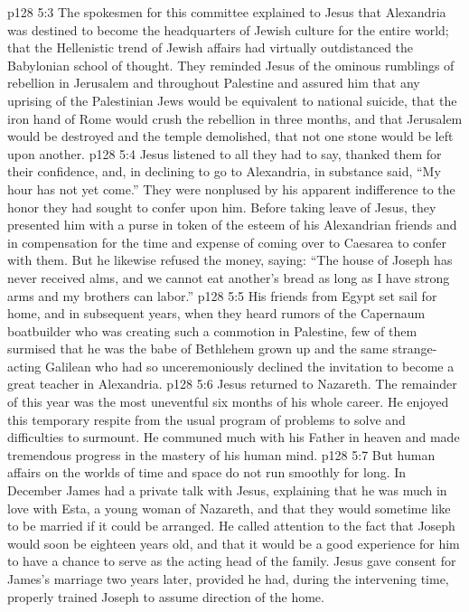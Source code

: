 \vs p128 5:3 The spokesmen for this committee explained to Jesus that Alexandria was destined to become the headquarters of Jewish culture for the entire world; that the Hellenistic trend of Jewish affairs had virtually outdistanced the Babylonian school of thought. They reminded Jesus of the ominous rumblings of rebellion in Jerusalem and throughout Palestine and assured him that any uprising of the Palestinian Jews would be equivalent to national suicide, that the iron hand of Rome would crush the rebellion in three months, and that Jerusalem would be destroyed and the temple demolished, that not one stone would be left upon another.
\vs p128 5:4 Jesus listened to all they had to say, thanked them for their confidence, and, in declining to go to Alexandria, in substance said, \textcolor{ubdarkred}{“My hour has not yet come.”} They were nonplused by his apparent indifference to the honor they had sought to confer upon him. Before taking leave of Jesus, they presented him with a purse in token of the esteem of his Alexandrian friends and in compensation for the time and expense of coming over to Caesarea to confer with them. But he likewise refused the money, saying: \textcolor{ubdarkred}{“The house of Joseph has never received alms, and we cannot eat another’s bread as long as I have strong arms and my brothers can labor.”}\plusone
\vs p128 5:5 His friends from Egypt set sail for home, and in subsequent years, when they heard rumors of the Capernaum boatbuilder who was creating such a commotion in Palestine, few of them surmised that he was the babe of Bethlehem grown up and the same strange\hyp{}acting Galilean who had so unceremoniously declined the invitation to become a great teacher in Alexandria.
\pc \vs p128 5:6 Jesus returned to Nazareth. The remainder of this year was the most uneventful six months of his whole career. He enjoyed this temporary respite from the usual program of problems to solve and difficulties to surmount. He communed much with his Father in heaven and made tremendous progress in the mastery of his human mind.
\vs p128 5:7 But human affairs on the worlds of time and space do not run smoothly for long. In December James had a private talk with Jesus, explaining that he was much in love with Esta, a young woman of Nazareth, and that they would sometime like to be married if it could be arranged. He called attention to the fact that Joseph would soon be eighteen years old, and that it would be a good experience for him to have a chance to serve as the acting head of the family. Jesus gave consent for James’s marriage two years later, provided he had, during the intervening time, properly trained Joseph to assume direction of the home.
